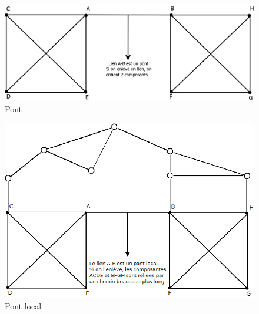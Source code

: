    \begin{figure}
    \center
    \includegraphics[scale=0.4]{images/18_Pont.png}
    \caption{\label{Pont} Pont}
    \end{figure}
    
    \begin{figure}
    \center
    \includegraphics[scale=0.5]{images/18_Pontlocal.png}
    \caption{\label{Pontlocal} Pont local}
    \end{figure}
